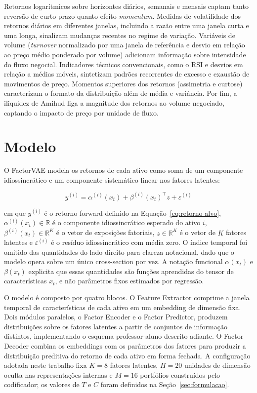 Retornos logarítmicos sobre horizontes diários, semanais e mensais captam tanto
reversão de curto prazo quanto efeito \textit{momentum}. Medidas de volatilidade dos
retornos diários em diferentes janelas, incluindo a razão entre uma janela curta e uma
longa, sinalizam mudanças recentes no regime de variação. Variáveis de volume
(\textit{turnover} normalizado por uma janela de referência e desvio em relação ao
preço médio ponderado por volume) adicionam informação sobre intensidade do fluxo
negocial. Indicadores técnicos convencionais, como o RSI e desvios em relação a médias
móveis, sintetizam padrões recorrentes de excesso e exaustão de movimentos de preço.
Momentos superiores dos retornos (assimetria e curtose) caracterizam o formato da
distribuição além de média e variância. Por fim, a iliquidez de Amihud liga a
magnitude dos retornos ao volume negociado, captando o impacto de preço por unidade de
fluxo.


\section{Modelo}
\label{sec:modelo}

O FactorVAE \parencite{duan2022} modela os retornos de cada ativo como soma de um
componente idiossincrático e um componente sistemático linear nos fatores latentes:

\begin{equation}
    y^{(i)} = \alpha^{(i)}(x_t) + \beta^{(i)}(x_t)^\top z + \varepsilon^{(i)}
    \label{eq:decomp-fatorial}
\end{equation}

em que $y^{(i)}$ é o retorno forward definido na Equação~\ref{eq:retorno-alvo},
$\alpha^{(i)}(x_t) \in \mathbb{R}$ é o componente idiossincrático esperado do
ativo $i$, $\beta^{(i)}(x_t) \in \mathbb{R}^K$ é o vetor de exposições fatoriais,
$z \in \mathbb{R}^K$ é o vetor de $K$ fatores latentes e $\varepsilon^{(i)}$ é o
resíduo idiossincrático com média zero. O índice temporal foi omitido das quantidades
do lado direito para clareza notacional, dado que o modelo opera sobre um único
cross-section por vez. A notação funcional $\alpha(x_t)$ e $\beta(x_t)$ explicita que
essas quantidades são funções aprendidas do tensor de características $x_t$, e não
parâmetros fixos estimados por regressão.

O modelo é composto por quatro blocos. O Feature Extractor comprime a janela temporal
de características de cada ativo em um embedding de dimensão fixa. Dois módulos
paralelos, o Factor Encoder e o Factor Predictor, produzem distribuições sobre os
fatores latentes a partir de conjuntos de informação distintos, implementando o esquema
professor-aluno descrito adiante. O Factor Decoder combina os embeddings com os
parâmetros dos fatores para produzir a distribuição preditiva do retorno de cada ativo
em forma fechada. A configuração adotada neste trabalho fixa $K = 8$ fatores latentes,
$H = 20$ unidades de dimensão oculta nas representações internas e $M = 16$ portfólios
construídos pelo codificador; os valores de $T$ e $C$ foram definidos na
Seção~\ref{sec:formulacao}.

